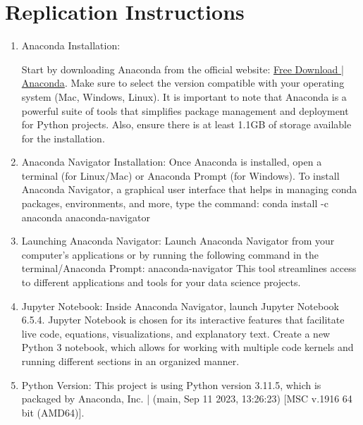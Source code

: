 \documentclass[10pt,twocolumn]{article}
\begin{document}
\section{Replication Instructions}
\begin{enumerate}
    \item Anaconda Installation:

Start by downloading Anaconda from the official website:  \href{https://www.anaconda.com/download}{Free Download | Anaconda}. Make sure to select the version compatible with your operating system (Mac, Windows, Linux). It is important to note that Anaconda is a powerful suite of tools that simplifies package management and deployment for Python projects. Also, ensure there is at least 1.1GB of storage available for the installation.
\newline
    \item Anaconda Navigator Installation:
Once Anaconda is installed, open a terminal (for Linux/Mac) or Anaconda Prompt (for Windows). To install Anaconda Navigator, a graphical user interface that helps in managing conda packages, environments, and more, type the command:
\newline     
     conda install -c anaconda anaconda-navigator
\newline
    \item Launching Anaconda Navigator: Launch Anaconda Navigator from your computer's applications or by running the following command in the terminal/Anaconda Prompt:
\newline     
     anaconda-navigator
\newline
This tool streamlines access to different applications and tools for your data science projects.
\newline
    \item Jupyter Notebook: 
\newline
Inside Anaconda Navigator, launch Jupyter Notebook 6.5.4. Jupyter Notebook is chosen for its interactive features that facilitate live code, equations, visualizations, and explanatory text. Create a new Python 3 notebook, which allows for working with multiple code kernels and running different sections in an organized manner.
\newline
    \item Python Version:
\newline    
This project is using Python version 3.11.5, which is packaged by Anaconda, Inc. | (main, Sep 11 2023, 13:26:23) [MSC v.1916 64 bit (AMD64)].
\newline

\end{enumerate}
\end{document}
